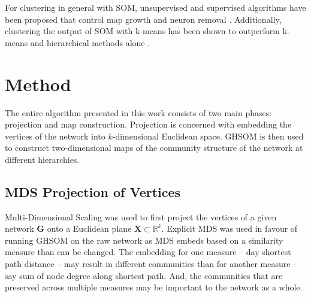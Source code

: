 \documentclass{article}
\begin{document}
For clustering in general with SOM, unsupervised and supervised algorithms have been proposed that control map growth and neuron removal \cite{fritzke1994growing}.
Additionally, clustering the output of SOM with k-means has been shown to outperform k-means and hierarchical methods alone \cite{kiang2001extending}.

\section{Method}
The entire algorithm presented in this work consists of two main phases: projection and map construction. Projection is concerned with embedding the vertices of the network into $k$-dimensional Euclidean space. GHSOM is then used to construct two-dimensional maps of the community structure of the network at different hierarchies.


\subsection{MDS Projection of Vertices}
Multi-Dimensional Scaling was used to first project the vertices of a given network $\textbf{G}$ onto a Euclidean plane $\textbf{X}\subset\mathbb{R}^k$.
Explicit MDS was used in favour of running GHSOM on the raw network as MDS embeds based on a similarity  measure than can be changed. The embedding for one measure -- day shortest path distance -- may result in different communities than for another measure -- say sum of node degree along shortest path. And, the communities that are preserved across multiple measures may be important to the network as a whole. %
 
\end{document}
